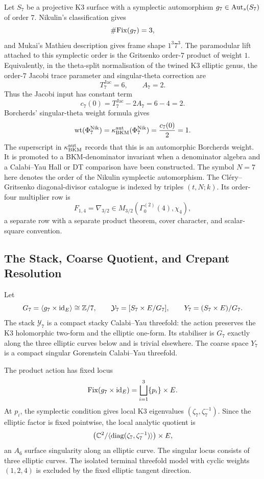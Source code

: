 Let \(S_7\) be a projective K3 surface with a symplectic automorphism
\(g_7\in\mathrm{Aut}_{s}(S_7)\) of order \(7\).  Nikulin's classification gives
\[
  \#\mathrm{Fix}(g_7)=3,
\]
and Mukai's Mathieu description gives frame shape \(1^3 7^3\).  The
paramodular lift attached to this symplectic order is the Gritsenko
order-\(7\) product of weight \(1\).  Equivalently, in the theta-split
normalisation of the twined K3 elliptic genus, the order-\(7\) Jacobi
trace parameter and singular-theta correction are
\[
  T^{\mathrm{Jac}}_7=6,\qquad
  A_7=2.
\]
Thus the Jacobi input has constant term
\[
  c_7(0)=T^{\mathrm{Jac}}_7-2A_7=6-4=2.
\]
Borcherds' singular-theta weight formula gives
\[
  \mathrm{wt}(\Phi_{7}^{\mathrm{Nik}})
  =
  \kappa_{\mathrm{BKM}}^{\mathrm{aut}}(\Phi_{7}^{\mathrm{Nik}})
  =
  \frac{c_7(0)}{2}
  =
  1.
\]
The superscript in \(\kappa_{\mathrm{BKM}}^{\mathrm{aut}}\) records that this is an automorphic
Borcherds weight.  It is promoted to a BKM-denominator invariant when a
denominator algebra and a Calabi--Yau Hall or DT comparison have been
constructed.
The symbol \(N=7\) here denotes the order of the Nikulin symplectic
automorphism.  The Cl\'ery--Gritsenko diagonal-divisor catalogue is
indexed by triples \((t,N;k)\).  Its order-four multiplier row is
\[
  F_{1,4}=\nabla_{3/2}\in
  M_{3/2}(\Gamma_0^{(2)}(4),\chi_4),
\]
a separate row with a separate product theorem, cover character, and
scalar-square convention.

\subsection*{The Stack, Coarse Quotient, and Crepant Resolution}

Let
\[
  G_7=\langle g_7\times\mathrm{id}_E\rangle\cong \mathbb{Z}/7,
  \qquad
  \mathcal Y_7=[S_7\times E/G_7],
  \qquad
  Y_7=(S_7\times E)/G_7 .
\]
The stack \(\mathcal Y_7\) is a compact stacky Calabi--Yau threefold:
the action preserves the K3 holomorphic two-form and the elliptic
one-form.  Its stabiliser is \(G_7\) exactly along the three elliptic
curves below and is trivial elsewhere.  The coarse space \(Y_7\) is a
compact singular Gorenstein Calabi--Yau threefold.

The product action has fixed locus
\[
  \mathrm{Fix}(g_7\times\mathrm{id}_E)
  =
  \bigsqcup_{i=1}^{3} \{p_i\}\times E .
\]
At \(p_i\), the symplectic condition gives local K3 eigenvalues
\((\zeta_7,\zeta_7^{-1})\).  Since the elliptic factor is fixed
pointwise, the local analytic quotient is
\[
  \bigl(\mathbb{C}^2/\langle\mathrm{diag}(\zeta_7,\zeta_7^{-1})\rangle\bigr)
  \times E,
\]
an \(A_6\) surface singularity along an elliptic curve.  The singular
locus consists of three elliptic curves.  The isolated terminal
threefold model with cyclic weights \((1,2,4)\) is excluded by the
fixed elliptic tangent direction.

